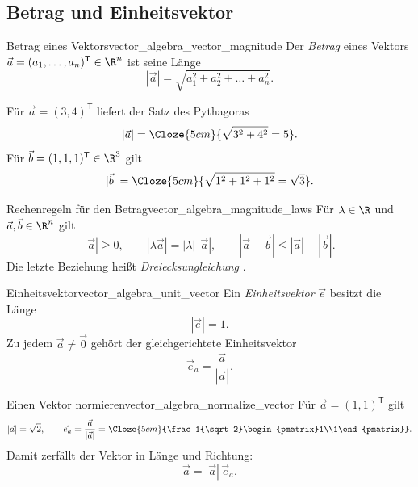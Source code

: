 \subsection{Betrag und Einheitsvektor}
\label{subsec:vector_algebra_magnitude_unit_vectors}

\begin{DefinitionBox}{Betrag eines Vektors}{vector_algebra_vector_magnitude}
  Der \emph{Betrag}  eines Vektors
  $\vec a=(a_1,\dots,a_n)^{\mathsf T}\in\R^n$ ist seine Länge
  \[
    |\vec a|
    =\sqrt{a_1^2+a_2^2+\dots+a_n^2}.
  \]
\end{DefinitionBox}

\noindent
\begin{minipage}[c]{0.52\linewidth}
  Für $\vec a=(3,4)^{\mathsf T}$ liefert der Satz des Pythagoras
  \[
    |\vec a|
    =\Cloze{5cm}{\sqrt{3^2+4^2}=5}.
  \]
  Für $\vec b=(1,1,1)^{\mathsf T}\in\R^3$ gilt
  \[
    |\vec b|
    =\Cloze{5cm}{\sqrt{1^2+1^2+1^2}=\sqrt3}.
  \]
\end{minipage}\hfill
\begin{minipage}[c]{0.44\linewidth}
  \centering
\end{minipage}

\begin{TheoremBox}{Rechenregeln für den Betrag}{vector_algebra_magnitude_laws}
  Für $\lambda\in\R$ und $\vec a,\vec b\in\R^n$ gilt
  \[
    |\vec a|\ge0,
    \qquad
    |\lambda\vec a|=|\lambda|\,|\vec a|,
    \qquad
    |\vec a+\vec b|\le|\vec a|+|\vec b|.
  \]
  Die letzte Beziehung heißt \emph{Dreiecksungleichung}
  .
\end{TheoremBox}

\begin{center}
\end{center}

\clearpage
\begin{DefinitionBox}{Einheitsvektor}{vector_algebra_unit_vector}
  Ein \emph{Einheitsvektor}  $\vec e$ besitzt die
  Länge
  \[
    |\vec e|=1.
  \]
  Zu jedem $\vec a\ne\vec 0$ gehört der gleichgerichtete Einheitsvektor
  \[
    \boxed{\vec e_a=\frac{\vec a}{|\vec a|}}.
  \]
\end{DefinitionBox}

\begin{ExampleBox}{Einen Vektor normieren}{vector_algebra_normalize_vector}
  Für $\vec a=(1,1)^{\mathsf T}$ gilt
  \[
    |\vec a|=\sqrt2,
    \qquad
    \vec e_a
    =\frac{\vec a}{|\vec a|}
    =\Cloze{5cm}{\frac1{\sqrt2}\begin{pmatrix}1\\1\end{pmatrix}}.
  \]
  Damit zerfällt der Vektor in Länge und Richtung:
  \[
    \boxed{\vec a=|\vec a|\,\vec e_a}.
  \]
\end{ExampleBox}

